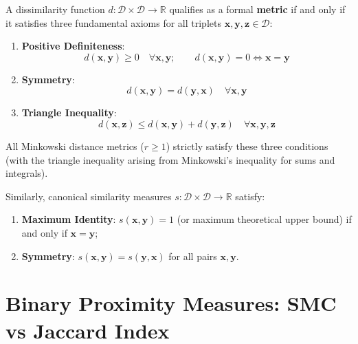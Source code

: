 \begin{definition}
A dissimilarity function $d: \mathcal{D} \times \mathcal{D} \to \mathbb{R}$ qualifies as a formal \textbf{metric} if and only if it satisfies three fundamental axioms for all triplets $\mathbf{x}, \mathbf{y}, \mathbf{z} \in \mathcal{D}$:
\begin{enumerate}
    \item \textbf{Positive Definiteness}:
    \begin{equation}
        d(\mathbf{x}, \mathbf{y}) \ge 0 \quad \forall \mathbf{x}, \mathbf{y}; \qquad d(\mathbf{x}, \mathbf{y}) = 0 \iff \mathbf{x} = \mathbf{y}
    \end{equation}
    \item \textbf{Symmetry}:
    \begin{equation}
        d(\mathbf{x}, \mathbf{y}) = d(\mathbf{y}, \mathbf{x}) \quad \forall \mathbf{x}, \mathbf{y}
    \end{equation}
    \item \textbf{Triangle Inequality}:
    \begin{equation}
        d(\mathbf{x}, \mathbf{z}) \le d(\mathbf{x}, \mathbf{y}) + d(\mathbf{y}, \mathbf{z}) \quad \forall \mathbf{x}, \mathbf{y}, \mathbf{z}
    \end{equation}
\end{enumerate}
\end{definition}

All Minkowski distance metrics ($r \ge 1$) strictly satisfy these three conditions (with the triangle inequality arising from Minkowski's inequality for sums and integrals).

Similarly, canonical similarity measures $s: \mathcal{D} \times \mathcal{D} \to \mathbb{R}$ satisfy:
\begin{enumerate}[noitemsep]
    \item \textbf{Maximum Identity}: $s(\mathbf{x}, \mathbf{y}) = 1$ (or maximum theoretical upper bound) if and only if $\mathbf{x} = \mathbf{y}$;
    \item \textbf{Symmetry}: $s(\mathbf{x}, \mathbf{y}) = s(\mathbf{y}, \mathbf{x})$ for all pairs $\mathbf{x}, \mathbf{y}$.
\end{enumerate}

\section{Binary Proximity Measures: SMC vs Jaccard Index}
\label{sec:dm-binary-proximity-jaccard}

